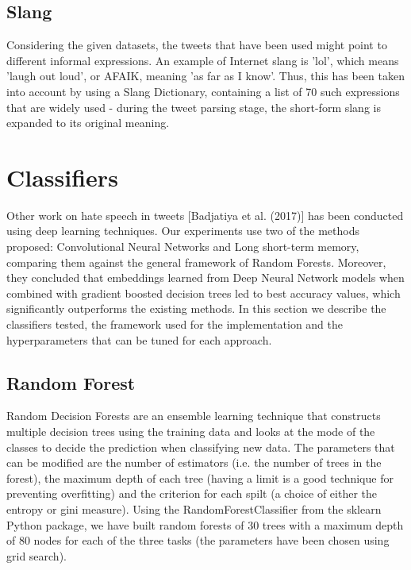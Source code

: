 \documentclass[11pt,a4paper]{article}
\begin{document}
\subsection{Slang}

Considering the given datasets, the tweets that have been used might point to different informal expressions. An example of Internet slang is 'lol', which means 'laugh out loud', or AFAIK, meaning 'as far as I know'. Thus, this has been taken into account by using a Slang Dictionary, containing a list of 70 such expressions that are widely used - during the tweet parsing stage, the short-form slang is expanded to its original meaning.

\section{Classifiers}

Other work on hate speech in tweets [Badjatiya et al. (2017)] has been conducted using deep learning techniques. Our experiments use two of the methods proposed: Convolutional Neural Networks and Long short-term memory, comparing them against the general framework of Random Forests. Moreover, they concluded that embeddings learned from Deep Neural Network models when combined with gradient boosted decision trees led to best accuracy values, which significantly outperforms the existing methods. In this section we describe the classifiers tested, the framework used for the implementation and the hyperparameters that can be tuned for each approach.

\subsection{Random Forest}

Random Decision Forests \cite{RF} are an ensemble learning technique that constructs multiple decision trees using the training data and looks at the mode of the classes to decide the prediction when classifying new data. The parameters that can be modified are the number of estimators (i.e. the number of trees in the forest), the maximum depth of each tree (having a limit is a good technique for preventing overfitting) and the criterion for each spilt (a choice of either the entropy or gini measure). Using the RandomForestClassifier from the sklearn Python package, we have built random forests of 30 trees with a maximum depth of 80 nodes for each of the three tasks (the parameters have been chosen using grid search).
\end{document}
